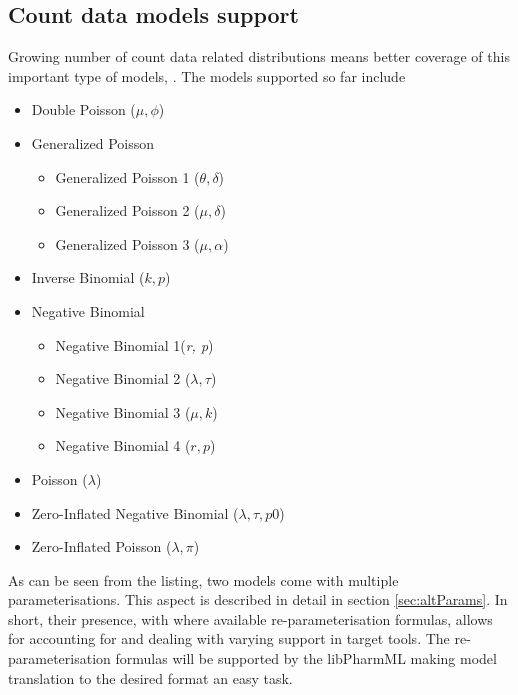 \subsection{Count data models support}
\label{subsec:countModels}
Growing number of count data related distributions means better coverage 
of this important type of models, \cite{Paule:2012fk, Plan:2014kq}. 
The models supported so far include
\begin{itemize}
\item 
Double Poisson ($\mu, \phi$)
\item 
Generalized Poisson
\begin{itemize}
\item 
Generalized Poisson 1 ($\theta, \delta$)
\item 
Generalized Poisson 2 ($\mu, \delta$)
\item 
Generalized Poisson 3 ($\mu, \alpha$)
\end{itemize}
\item 
Inverse Binomial ($k, p$)
\item 
Negative Binomial 
\begin{itemize}
\item 
Negative Binomial 1(\emph{r, p})
\item 
Negative Binomial 2 ($\lambda, \tau$)
\item 
Negative Binomial 3 	($\mu, k$)
\item 
Negative Binomial 4 	($r,p$)
\end{itemize}
\item 
Poisson ($\lambda$)
\item 
Zero-Inflated Negative Binomial ($\lambda, \tau, p0$)
\item 
Zero-Inflated Poisson ($\lambda, \pi$)
\end{itemize}
As can be seen from the listing, two models come with multiple 
parameterisations. This aspect is described in detail in section 
\ref{sec:altParams}. 
In short,  their presence, with where available re-parameterisation formulas,
allows for accounting for and dealing with varying support in target tools.
The re-parameterisation formulas will be supported by the libPharmML
making model translation to the desired format an easy task. 


